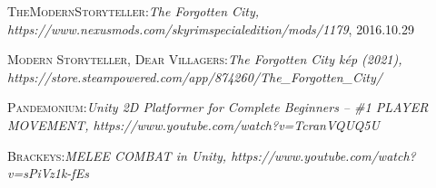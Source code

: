 \documentclass[]{thesis-ekf}
\theoremstyle{definition}
\begin{document}
\begin{thebibliography}{2}
		\textsc{TheModernStoryteller}:\emph{The Forgotten City, https://www.nexusmods.com/skyrimspecialedition/mods/1179}, 2016.10.29
		
		\textsc{Modern Storyteller, Dear Villagers}:\emph{The Forgotten City kép (2021), https://store.steampowered.com/app/874260/The\_Forgotten\_City/}
		
		\textsc{Pandemonium}:\emph{Unity 2D Platformer for Complete Beginners -- \#1 PLAYER MOVEMENT, https://www.youtube.com/watch?v=TcranVQUQ5U}
		
		\textsc{Brackeys}:\emph{MELEE COMBAT in Unity, https://www.youtube.com/watch?v=sPiVz1k-fEs}
	\end{thebibliography}
	
\end{document}
